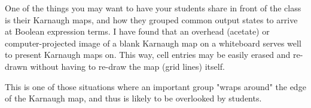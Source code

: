 
One of the things you may want to have your students share in front of the class is their Karnaugh maps, and how they grouped common output states to arrive at Boolean expression terms.  I have found that an overhead (acetate) or computer-projected image of a blank Karnaugh map on a whiteboard serves well to present Karnaugh maps on.  This way, cell entries may be easily erased and re-drawn without having to re-draw the map (grid lines) itself.

This is one of those situations where an important group "wraps around" the edge of the Karnaugh map, and thus is likely to be overlooked by students.




